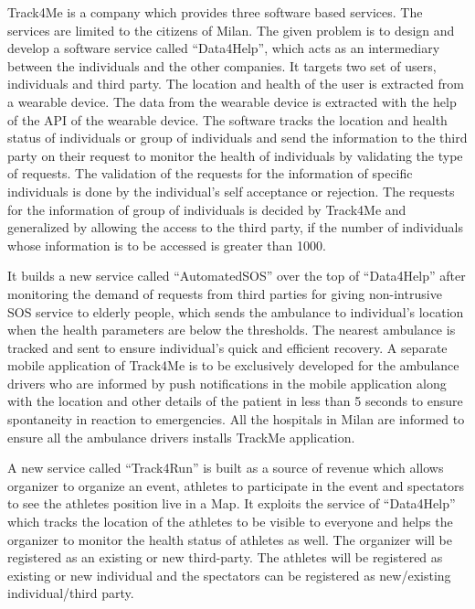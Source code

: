 Track4Me is a company which provides three software based services. The services are limited to the citizens of Milan. The given problem is to design and develop a software service called  “Data4Help”,  which acts as an intermediary between the individuals and the other companies. It targets two set of users, individuals and third party. The location and health of the user is extracted from a wearable device. The data from the wearable device is extracted with the help of the API of the wearable device. The software tracks the location and health status of individuals or group of individuals and send the information to the third party on their request to monitor the health of individuals by validating the type of requests. The validation of the requests for the information of specific individuals is done by the individual’s self acceptance or rejection. The requests for the information of group of individuals is decided by Track4Me and generalized by allowing the access to the third party, if the number of individuals whose information is to be accessed is greater than 1000.

It builds a new service called “AutomatedSOS” over the top of “Data4Help” after monitoring the demand of requests from third parties for giving non-intrusive SOS service to elderly people, which sends the ambulance to individual’s location when the health parameters are below the thresholds. The nearest ambulance is tracked and sent to ensure individual’s quick and efficient recovery. A separate mobile application of Track4Me is to be exclusively developed for the ambulance drivers who are informed by push notifications in the mobile application along with the location and other details of the patient in less than 5 seconds to ensure spontaneity in reaction to emergencies. All the hospitals in Milan are informed to ensure all the ambulance drivers installs TrackMe application.

A new service called “Track4Run” is built as a source of revenue which allows organizer to organize an event, athletes to participate in the event and spectators to see the athletes position live in a Map. It exploits the service of “Data4Help” which tracks the location of the athletes to be visible to everyone and helps the organizer to monitor the health status of athletes as well. The organizer will be registered as an existing or new third-party. The athletes will be registered as existing or new individual and the spectators can be registered as new/existing individual/third party.

